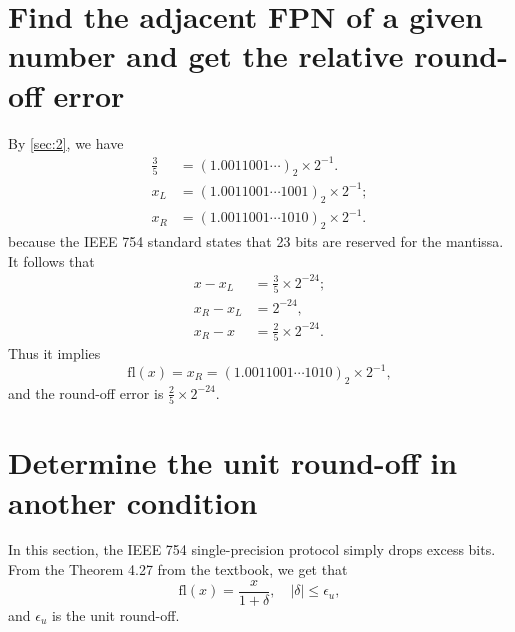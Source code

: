 \documentclass[a4paper]{article}
\begin{document}
\section{Find the adjacent FPN of a given number and get the relative round-off error}

By \cref{sec:2}, we have 
\begin{equation}
    \begin{aligned}
        \frac{3}{5} &= (1.0011001\cdots)_2 \times 2^{-1}. \\
        x_L &= (1.0011001\cdots 1001)_2 \times 2^{-1}; \\
        x_R &= (1.0011001\cdots 1010)_2 \times 2^{-1}. 
    \end{aligned}
    \label{eq:4_adjacent_fpn}
\end{equation}
because the IEEE 754 standard states that 23 bits are reserved for the mantissa. It follows that 
\begin{equation}
    \begin{aligned}
        x - x_L &= \frac{3}{5} \times 2^{-24}; \\
        x_R - x_L &= 2^{-24}, \\
        x_R - x &= \frac{2}{5} \times 2^{-24}. 
    \end{aligned}
    \label{eq:4_round_off_error}
\end{equation}
Thus it implies 
\begin{equation}
    \text{fl}(x) = x_R = (1.0011001\cdots 1010)_2 \times 2^{-1},
    \label{eq:4_fl}
\end{equation}
and the round-off error is $\frac{2}{5} \times 2^{-24}$.

\section{Determine the unit round-off in another condition}

In this section, the IEEE 754 single-precision protocol simply drops excess bits. From the Theorem 4.27 from the textbook, we get that 
\begin{equation}
    \text{fl}(x) = \frac{x}{1 + \delta}, \quad |\delta| \leqslant \epsilon_u,
    \label{eq:5_fl}
\end{equation}
and $\epsilon_u$ is the unit round-off.
\end{document}
